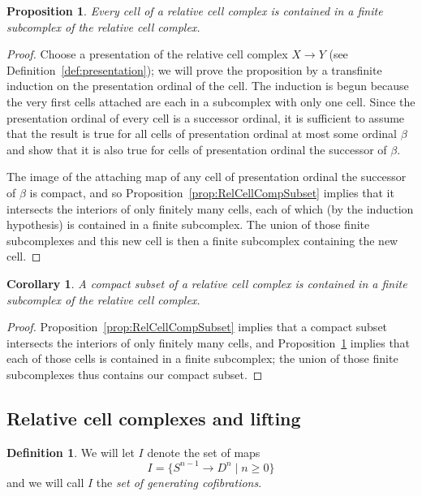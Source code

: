 \documentclass[12pt]{amsart}
\numberwithin{equation}{section}
\theoremstyle{slplain}
\newtheorem{cor}[equation]{Corollary}
\newtheorem{prop}[equation]{Proposition}
\theoremstyle{definition}
\newtheorem{defn}[equation]{Definition} %
\theoremstyle{remark}
\newcommand{\propref}{Proposition~\ref}
\newcommand{\defref}{Definition~\ref}
\newcommand{\suchthat}{\mid}
\begin{document}
\begin{prop}
  \label{prop:SubCount}
  Every cell of a relative cell complex is contained in a finite
  subcomplex of the relative cell complex.
\end{prop}

\begin{proof}
  Choose a presentation of the relative cell complex $X \to Y$ (see
  \defref{def:presentation}); we will prove the proposition by a
  transfinite induction on the presentation ordinal of the cell.  The
  induction is begun because the very first cells attached are each in
  a subcomplex with only one cell.  Since the presentation ordinal of
  every cell is a successor ordinal, it is sufficient to assume that
  the result is true for all cells of presentation ordinal at most
  some ordinal $\beta$ and show that it is also true for cells of
  presentation ordinal the successor of $\beta$.

  The image of the attaching map of any cell of presentation ordinal
  the successor of $\beta$ is compact, and so
  \propref{prop:RelCellCompSubset} implies that it intersects the
  interiors of only finitely many cells, each of which (by the
  induction hypothesis) is contained in a finite subcomplex.  The
  union of those finite subcomplexes and this new cell is then a
  finite subcomplex containing the new cell.
\end{proof}


\begin{cor}
  \label{cor:CellGenFiniteSubcmp}
  A compact subset of a relative cell complex is contained in a finite
  subcomplex of the relative cell complex.
\end{cor}

\begin{proof}
  \propref{prop:RelCellCompSubset} implies that a compact subset
  intersects the interiors of only finitely many cells, and
  \propref{prop:SubCount} implies that each of those cells is
  contained in a finite subcomplex; the union of those finite
  subcomplexes thus contains our compact subset.
\end{proof}

\subsection{Relative cell complexes and lifting}
\label{sec:ClCmpLift}

\begin{defn}
  \label{def:gc}
  We will let $I$ denote the set of maps
  \begin{displaymath}
    I = \bigl\{S^{n-1} \to D^{n} \suchthat n \ge 0\bigr\}
  \end{displaymath}
  and we will call $I$ the \emph{set of generating cofibrations}.
\end{defn}
\end{document}
